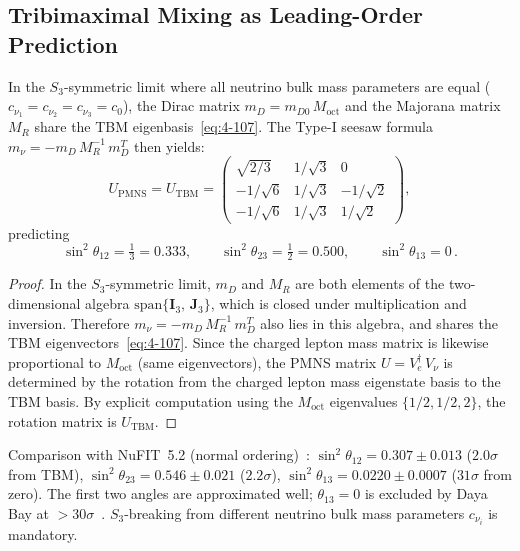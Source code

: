 \subsection{Tribimaximal Mixing as Leading-Order Prediction}
\label{sec:4-tbm}

\begin{theorem}\label{thm:4-tbm}
In the $S_3$-symmetric limit where all neutrino bulk mass parameters are equal ($c_{\nu_1} = c_{\nu_2} = c_{\nu_3} = c_0$), the Dirac matrix $m_D = m_{D0}\, M_{\mathrm{oct}}$ and the Majorana matrix $M_R$ share the TBM eigenbasis~\eqref{eq:4-107}. The Type-I seesaw formula $m_\nu = -m_D\, M_R^{-1}\, m_D^T$ then yields:
\begin{equation}
  U_{\mathrm{PMNS}} = U_{\mathrm{TBM}} = \begin{pmatrix}
    \sqrt{2/3} & 1/\sqrt{3} & 0 \\
    -1/\sqrt{6} & 1/\sqrt{3} & -1/\sqrt{2} \\
    -1/\sqrt{6} & 1/\sqrt{3} & 1/\sqrt{2}
  \end{pmatrix},
  \label{eq:4-108}
\end{equation}
predicting
\begin{equation}
  \sin^2\theta_{12} = \tfrac{1}{3} = 0.333, \qquad
  \sin^2\theta_{23} = \tfrac{1}{2} = 0.500, \qquad
  \sin^2\theta_{13} = 0\,.
  \label{eq:4-109}
\end{equation}
\end{theorem}

\begin{proof}
In the $S_3$-symmetric limit, $m_D$ and $M_R$ are both elements of the two-dimensional algebra $\mathrm{span}\{\mathbf{I}_3,\, \mathbf{J}_3\}$, which is closed under multiplication and inversion. Therefore $m_\nu = -m_D\, M_R^{-1}\, m_D^T$ also lies in this algebra, and shares the TBM eigenvectors~\eqref{eq:4-107}. Since the charged lepton mass matrix is likewise proportional to $M_{\mathrm{oct}}$ (same eigenvectors), the PMNS matrix $U = V_e^\dagger\, V_\nu$ is determined by the rotation from the charged lepton mass eigenstate basis to the TBM basis. By explicit computation using the $M_{\mathrm{oct}}$ eigenvalues $\{1/2, 1/2, 2\}$, the rotation matrix is $U_{\mathrm{TBM}}$.
\end{proof}

Comparison with NuFIT~5.2 (normal ordering)~\cite{ch4:NuFIT2024}: $\sin^2\theta_{12} = 0.307 \pm 0.013$ ($2.0\sigma$ from TBM), $\sin^2\theta_{23} = 0.546 \pm 0.021$ ($2.2\sigma$), $\sin^2\theta_{13} = 0.0220 \pm 0.0007$ ($31\sigma$ from zero). The first two angles are approximated well; $\theta_{13} = 0$ is excluded by Daya Bay at $> 30\sigma$~\cite{ch4:DayaBay2012}. $S_3$-breaking from different neutrino bulk mass parameters $c_{\nu_i}$ is mandatory.

